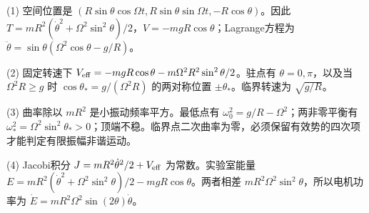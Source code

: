(1) 空间位置是 \((R\sin\theta\cos\Omega t,R\sin\theta\sin\Omega t,-R\cos\theta)\)。因此 \(T=mR^2(\dot\theta^2+\Omega^2\sin^2\theta)/2\)，\(V=-mgR\cos\theta\)；Lagrange方程为 \(\ddot\theta=\sin\theta(\Omega^2\cos\theta-g/R)\)。

(2) 固定转速下 \(V_{\rm eff}=-mgR\cos\theta-m\Omega^2R^2\sin^2\theta/2\)。驻点有 \(\theta=0,\pi\)，以及当 \(\Omega^2R\ge g\) 时 \(\cos\theta_*=g/(\Omega^2R)\) 的两对称位置 \(\pm\theta_*\)。临界转速为 \(\sqrt{g/R}\)。

(3) 曲率除以 \(mR^2\) 是小振动频率平方。最低点有 \(\omega_0^2=g/R-\Omega^2\)；两非零平衡有 \(\omega_*^2=\Omega^2\sin^2\theta_*>0\)；顶端不稳。临界点二次曲率为零，必须保留有效势的四次项才能判定有限振幅非谐运动。

(4) Jacobi积分 \(J=mR^2\dot\theta^2/2+V_{\rm eff}\) 为常数。实验室能量 \(E=mR^2(\dot\theta^2+\Omega^2\sin^2\theta)/2-mgR\cos\theta\)。两者相差 \(mR^2\Omega^2\sin^2\theta\)，所以电机功率为 \(\dot E=mR^2\Omega^2\sin(2\theta)\dot\theta\)。
